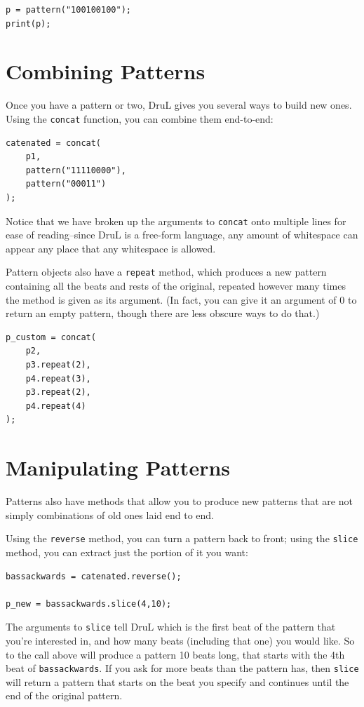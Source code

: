\begin{lstlisting}
p = pattern("100100100");
print(p);
\end{lstlisting}


\section{Combining Patterns}
	
Once you have a pattern or two, DruL gives you several ways to build new ones.  Using the {\tt concat} function, you can combine them end-to-end:
\begin{lstlisting}
catenated = concat(
	p1, 
	pattern("11110000"), 
	pattern("00011")
);
\end{lstlisting}
Notice that we have broken up the arguments to {\tt concat} onto multiple lines for ease of reading--since DruL is a free-form language, any amount of whitespace can appear any place that any whitespace is allowed.

Pattern objects also have a {\tt repeat} method, which produces a new pattern containing all the beats and rests of the original, repeated however many times the method is given as its argument.  (In fact, you can give it an argument of 0 to return an empty pattern, though there are less obscure ways to do that.)

\begin{lstlisting}
p_custom = concat(
	p2, 
	p3.repeat(2),
	p4.repeat(3),
	p3.repeat(2),
	p4.repeat(4)
);
\end{lstlisting}	
\section{Manipulating Patterns}

Patterns also have methods that allow you to produce new patterns that are not simply combinations of old ones laid end to end.

Using the {\tt reverse} method, you can turn a pattern back to front; using the {\tt slice} method, you can extract just the portion of it you want:

\begin{lstlisting}
bassackwards = catenated.reverse();

p_new = bassackwards.slice(4,10);
\end{lstlisting}

The arguments to {\tt slice} tell DruL which is the first beat of the pattern that you're interested in, and how many beats (including that one) you would like.  So to the call above will produce a pattern 10 beats long, that starts with the 4th beat of {\tt bassackwards}.  If you ask for more beats than the pattern has, then {\tt slice} will return a pattern that starts on the beat you specify and continues until the end of the original pattern.

